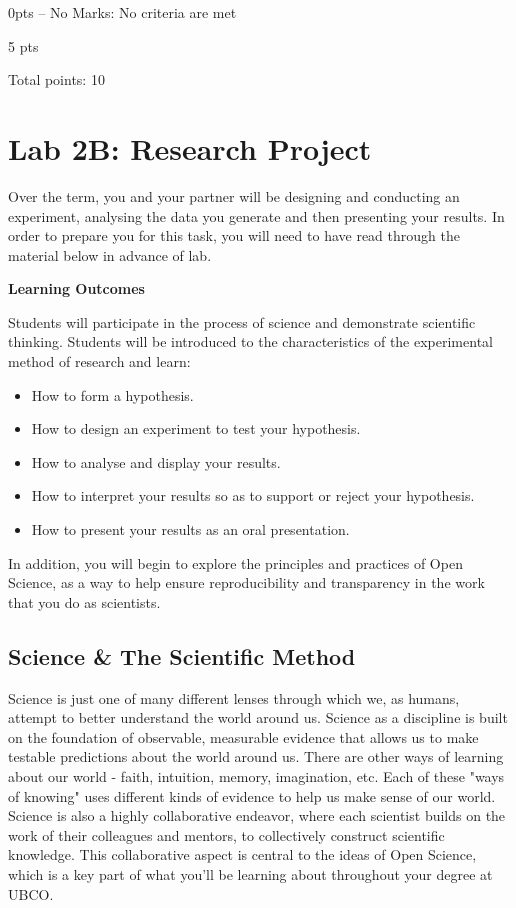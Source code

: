 \documentclass[
]{book}
\providecommand{\tightlist}{%
  \setlength{\itemsep}{0pt}\setlength{\parskip}{0pt}}
\begin{document}
0pts -- No Marks: No criteria are met

5 pts

Total points: 10

\hypertarget{lab-2b-research-project}{%
\chapter*{Lab 2B: Research Project}\label{lab-2b-research-project}}

Over the term, you and your partner will be designing and conducting an experiment, analysing the data you generate and then presenting your results. In order to prepare you for this task, you will need to have read through the material below in advance of lab.

\textbf{Learning Outcomes}

Students will participate in the process of science and demonstrate scientific thinking. Students will be introduced to the characteristics of the experimental method of research and learn:

\begin{itemize}
\tightlist
\item
  How to form a hypothesis.
\item
  How to design an experiment to test your hypothesis.
\item
  How to analyse and display your results.
\item
  How to interpret your results so as to support or reject your hypothesis.
\item
  How to present your results as an oral presentation.
\end{itemize}

In addition, you will begin to explore the principles and practices of Open Science, as a way to help ensure reproducibility and transparency in the work that you do as scientists.

\hypertarget{science-the-scientific-method}{%
\section*{Science \& The Scientific Method}\label{science-the-scientific-method}}

Science is just one of many different lenses through which we, as humans, attempt to better understand the world around us. Science as a discipline is built on the foundation of observable, measurable evidence that allows us to make testable predictions about the world around us. There are other ways of learning about our world - faith, intuition, memory, imagination, etc. Each of these "ways of knowing" uses different kinds of evidence to help us make sense of our world. Science is also a highly collaborative endeavor, where each scientist builds on the work of their colleagues and mentors, to collectively construct scientific knowledge. This collaborative aspect is central to the ideas of Open Science, which is a key part of what you'll be learning about throughout your degree at UBCO.
\end{document}
